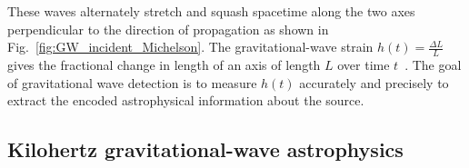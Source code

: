 These waves alternately stretch and squash spacetime along the two axes perpendicular to the direction of propagation as shown in Fig.~\ref{fig:GW_incident_Michelson}. %
The gravitational-wave strain $h(t)=\frac{\Delta L}{L}$ gives the fractional change in length of an axis of length $L$ over time $t$~\cite{cai_2017}. The goal of gravitational wave detection is to measure $h(t)$ accurately and precisely to extract the encoded astrophysical information about the source.


\subsection{Kilohertz gravitational-wave astrophysics} %
\label{sec:kilohertz_GW}

